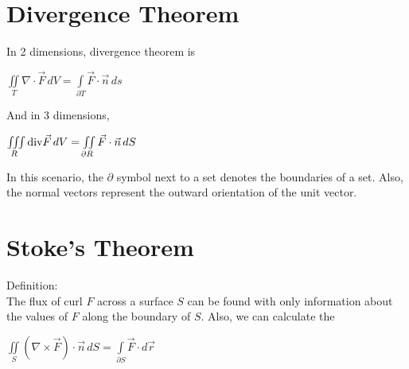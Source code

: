 \documentclass[12pt, letterpaper]{article}
\begin{document}
  \maketitle
  \section*{Divergence Theorem}

  In 2 dimensions, divergence theorem is
  \begin{center}
    \(\iint \limits_T \nabla \cdot \vec{F}\,dV = \int \limits_{\partial T} \vec{F} \cdot \vec{n} \, ds\)
  \end{center}

  \noindent And in 3 dimensions,
  \begin{center}
    \(\iiint \limits_R \textnormal{div}\vec{F}\,dV = \iint \limits_{\partial R}\vec{F} \cdot \vec{n}\,dS\)
  \end{center}

  \noindent In this scenario, the \(\partial\) symbol next to a set denotes the boundaries of a set. Also, the normal vectors represent the outward orientation of the unit vector.

\pagebreak

\section*{Stoke's Theorem}

Definition: \\
The flux of curl \(F\) across a surface \(S\) can be found with only information about the values of \(F\) along the boundary of \(S\). Also, we can calculate the 

\begin{center}
  \(\iint \limits_S (\nabla \times \vec{F}) \cdot \vec{n} \, dS = \int \limits_{\partial S} \vec{F} \cdot d\vec{r}\)
\end{center}
\end{document}
